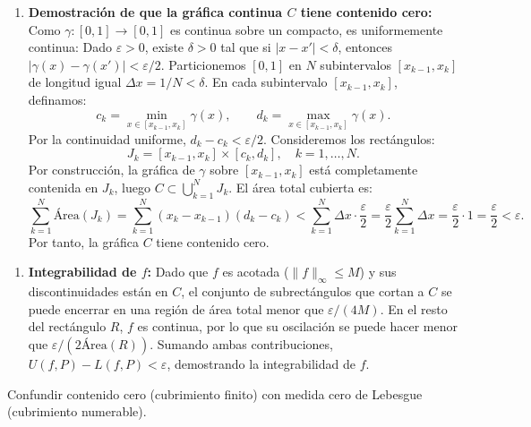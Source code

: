 \documentclass[11pt,a4paper]{article}
\begin{document}
\begin{enumerate}[label=\textbf{\arabic*.}]
\item \textbf{Demostración de que la gráfica continua $C$ tiene contenido cero:}
Como $\gamma: [0,1] \to [0,1]$ es continua sobre un compacto, es uniformemente continua:
Dado $\varepsilon > 0$, existe $\delta > 0$ tal que si $|x - x'| < \delta$, entonces $|\gamma(x) - \gamma(x')| < \varepsilon / 2$.
Particionemos $[0,1]$ en $N$ subintervalos $[x_{k-1}, x_k]$ de longitud igual $\Delta x = 1/N < \delta$.
En cada subintervalo $[x_{k-1}, x_k]$, definamos:
\begin{equation*}
c_k = \min_{x \in [x_{k-1}, x_k]} \gamma(x), \qquad d_k = \max_{x \in [x_{k-1}, x_k]} \gamma(x).
\end{equation*}
Por la continuidad uniforme, $d_k - c_k < \varepsilon / 2$.
Consideremos los rectángulos:
\begin{equation*}
J_k = [x_{k-1}, x_k] \times [c_k, d_k], \quad k = 1, \dots, N.
\end{equation*}
Por construcción, la gráfica de $\gamma$ sobre $[x_{k-1}, x_k]$ está completamente contenida en $J_k$, luego $C \subset \bigcup_{k=1}^N J_k$.
El área total cubierta es:
\begin{equation*}
\sum_{k=1}^N \text{Área}(J_k) = \sum_{k=1}^N (x_k - x_{k-1})(d_k - c_k) < \sum_{k=1}^N \Delta x \cdot \frac{\varepsilon}{2} = \frac{\varepsilon}{2} \sum_{k=1}^N \Delta x = \frac{\varepsilon}{2} \cdot 1 = \frac{\varepsilon}{2} < \varepsilon.
\end{equation*}
Por tanto, la gráfica $C$ tiene contenido cero.
\end{enumerate}

\begin{enumerate}[label=\textbf{\arabic*.}]
\item \textbf{Integrabilidad de $f$:}
Dado que $f$ es acotada ($\|f\|_\infty \le M$) y sus discontinuidades están en $C$, el conjunto de subrectángulos que cortan a $C$ se puede encerrar en una región de área total menor que $\varepsilon / (4M)$.
En el resto del rectángulo $R$, $f$ es continua, por lo que su oscilación se puede hacer menor que $\varepsilon / (2\text{Área}(R))$.
Sumando ambas contribuciones, $U(f,P) - L(f,P) < \varepsilon$, demostrando la integrabilidad de $f$.
\end{enumerate}

\begin{trapbox}
Confundir contenido cero (cubrimiento finito) con medida cero de Lebesgue (cubrimiento numerable).
\end{trapbox}
\end{document}
